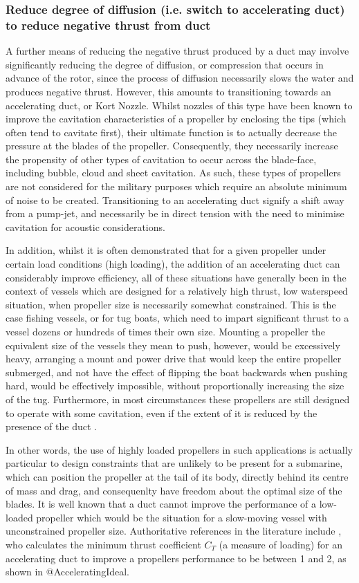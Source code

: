 \documentclass{article}\usepackage[]{graphicx}\usepackage[]{color}
\begin{document}
\subsubsection{Reduce degree of diffusion (i.e. switch to accelerating duct) to reduce negative thrust from duct}
A further means of reducing the negative thrust produced by a duct may involve significantly reducing the degree of diffusion, or compression that occurs in advance of the rotor, since the process of diffusion necessarily slows the water and produces negative thrust.  However, this amounts to transitioning towards an accelerating duct, or Kort Nozzle. Whilst nozzles of this type have been known to improve the cavitation characteristics of a propeller by enclosing the tips (which often tend to cavitate first), their ultimate function is to actually decrease the pressure at the blades of the propeller.  Consequently, they necessarily increase the propensity of other types of cavitation to occur across the blade-face, including bubble, cloud and sheet cavitation. As such, these types of propellers are not considered for the military purposes which require an absolute minimum of noise to be created.  Transitioning to an accelerating duct signify a shift away from a pump-jet, and necessarily be in direct tension with the need to minimise cavitation for acoustic considerations.

In addition, whilst it is often demonstrated that for a given propeller under certain load conditions (high loading), the addition of an accelerating duct can considerably improve efficiency, all of these situations have generally been in the context of vessels which are designed for a relatively high thrust, low waterspeed situation, when propeller size is necessarily somewhat constrained.  This is the case fishing vessels, or for tug boats, which need to impart significant thrust to a vessel dozens or hundreds of times their own size.  Mounting a propeller the equivalent size of the vessels they mean to push, however, would be excessively heavy, arranging a mount and power drive that would keep the entire propeller submerged, and not have the effect of flipping the boat backwards when pushing hard, would be effectively impossible, without proportionally increasing the size of the tug. Furthermore, in most circumstances these propellers are still designed to operate with some cavitation, even if the extent of it is reduced by the presence of the duct \parencite{haimov2010}.

In other words, the use of highly loaded propellers in such applications is actually particular to design constraints that are unlikely to be present for a submarine, which can position the propeller at the tail of its body, directly behind its centre of mass and drag, and consequenlty have freedom about the optimal size of the blades.  It is well known that a duct cannot improve the performance of a low-loaded propeller which would be the situation for a slow-moving vessel with unconstrained propeller size.  Authoritative references in the literature include \cite{oosterveld1970}, who calculates the minimum thrust coefficient $C_T$ (a measure of loading) for an accelerating duct to improve a propellers performance to be between 1 and 2, as shown in @AcceleratingIdeal.
\end{document}
